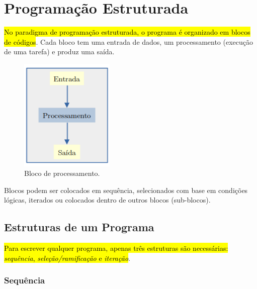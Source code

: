 
\chapter{Programação Estruturada}\label{cap_progest}

\hl{No paradigma de programação estruturada, o programa é organizado em blocos de códigos}. Cada bloco tem uma entrada de dados, um processamento (execução de uma tarefa) e produz uma saída.

\begin{figure}[H]
  \centering
  \includegraphics[width=0.4\textwidth]{./cap_progest/dados/fig_fg_bloco/fig}
  \caption{Bloco de processamento.}
  \label{cap_progest:fig:fg_bloco}
\end{figure}

Blocos podem ser colocados em sequência, selecionados com base em condições lógicas, iterados ou colocados dentro de outros blocos (sub-blocos).

\section{Estruturas de um Programa}\label{cap_progest_sec_est}

\hl{Para escrever qualquer programa, apenas três estruturas são necessárias: \emph{sequência}, \emph{seleção/ramificação} e \emph{iteração}}.

\subsection{Sequência}


